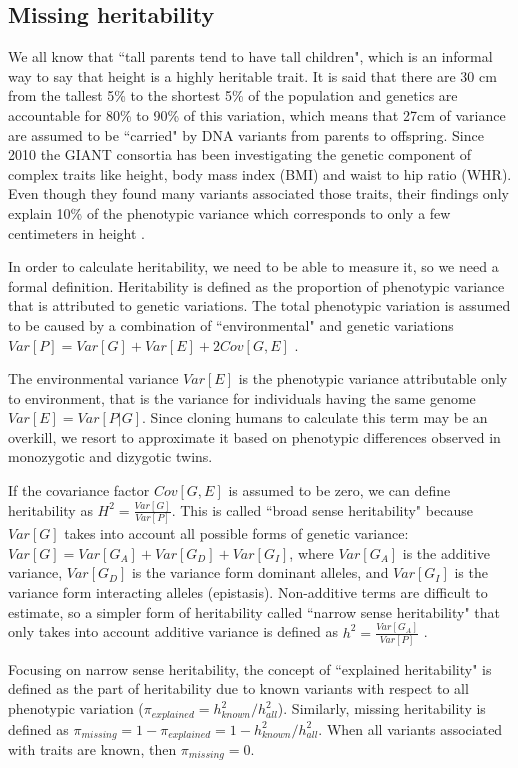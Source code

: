 \subsection{Missing heritability}

We all know that ``tall parents tend to have tall children", which is an informal way to say that height is a highly heritable trait. It is said that there are 30 cm from the tallest 5\% to the shortest 5\% of the population and genetics are accountable for 80\% to 90\% of this variation, which means that 27cm of variance are assumed to be ``carried" by DNA variants from parents to offspring. Since 2010 the GIANT consortia has been investigating the genetic component of complex traits like height, body mass index (BMI) and waist to hip ratio (WHR). Even though they found many variants associated those traits, their findings only explain 10\% of the phenotypic variance which corresponds to only a few centimeters in height \cite{wood2014defining}.

In order to calculate heritability, we need to be able to measure it, so we need a formal definition. Heritability is defined as the proportion of phenotypic variance that is attributed to genetic variations. The total phenotypic variation is assumed to be caused by a combination of ``environmental" and genetic variations $Var[P] = Var[G] + Var[E] + 2 Cov[G, E]$ \cite{Emerson}.

The environmental variance $Var[E]$ is the phenotypic variance attributable only to environment, that is the variance for individuals having the same genome $Var[E] = Var[P|G]$. Since cloning humans to calculate this term may be an overkill, we resort to approximate it based on phenotypic differences observed in monozygotic and dizygotic twins.

If the covariance factor $Cov[G, E]$ is assumed to be zero, we can define heritability as $H^2 = \frac{Var[G] }{ Var[P]}$. This is called ``broad sense heritability" because $Var[G]$ takes into account all possible forms of genetic variance: $Var[G] = Var[G_A] + Var[G_D] + Var[G_I]$, where $Var[G_A]$ is the additive variance, $Var[G_D]$ is the variance form dominant alleles, and $Var[G_I]$ is the variance form interacting alleles (epistasis). Non-additive terms are difficult to estimate, so a simpler form of heritability called ``narrow sense heritability" that only takes into account additive variance is defined as $h^2 = \frac{ Var[G_A] }{ Var[P] }$ \cite{zuk2012mystery}.

Focusing on narrow sense heritability, the concept of ``explained heritability" is defined as the part of heritability due to known variants with respect to all phenotypic variation ($\pi_{explained} = h^2_{known} / h^2_{all}$). Similarly, missing heritability is defined as $\pi_{missing} = 1 - \pi_{explained} = 1 - h^2_{known} / h^2_{all}$. When all variants associated with traits are known, then $\pi_{missing} = 0$.


